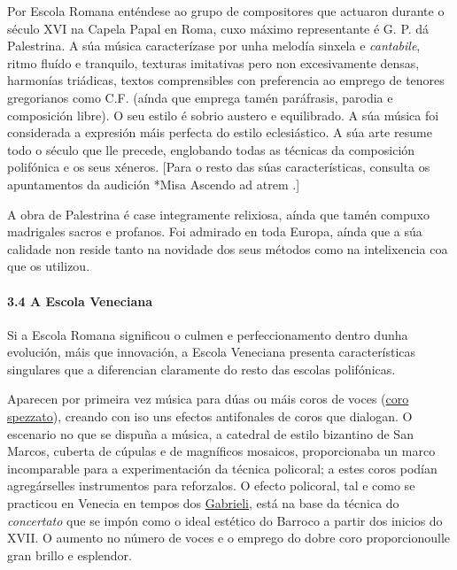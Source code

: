 \documentclass[
]{article}
\begin{document}
Por Escola Romana enténdese ao grupo de compositores que actuaron
durante o século XVI na Capela Papal en Roma, cuxo máximo representante
é G. P. dá Palestrina. A súa música caracterízase por unha melodía
sinxela e \emph{cantabile}, ritmo fluído e tranquilo, texturas
imitativas pero non excesivamente densas, harmonías triádicas, textos
comprensibles con preferencia ao emprego de tenores gregorianos como
C.F. (aínda que emprega tamén paráfrasis, parodia e composición libre).
O seu estilo é sobrio austero e equilibrado. A súa música foi
considerada a expresión máis perfecta do estilo eclesiástico. A súa arte
resume todo o século que lle precede, englobando todas as técnicas da
composición polifónica e os seus xéneros. {[}Para o resto das súas
características, consulta os apuntamentos da audición *Misa Ascendo ad
atrem .{]}

A obra de Palestrina é case integramente relixiosa, aínda que tamén
compuxo madrigales sacros e profanos. Foi admirado en toda Europa, aínda
que a súa calidade non reside tanto na novidade dos seus métodos como na
intelixencia coa que os utilizou.

\hypertarget{34-a-escola-veneciana}{%
\paragraph{\texorpdfstring{\textbf{3.4 A Escola
Veneciana}}{3.4 A Escola Veneciana}}\label{34-a-escola-veneciana}}

Si a Escola Romana significou o culmen e perfeccionamento dentro dunha
evolución, máis que innovación, a Escola Veneciana presenta
características singulares que a diferencian claramente do resto das
escolas polifónicas.

Aparecen por primeira vez música para dúas ou máis coros de voces
(\href{http://es.wikipedia.org/wiki/Estilo_policoral_veneciano}{coro
spezzato}), creando con iso uns efectos antifonales de coros que
dialogan. O escenario no que se dispuña a música, a catedral de estilo
bizantino de San Marcos, cuberta de cúpulas e de magníficos mosaicos,
proporcionaba un marco incomparable para a experimentación da técnica
policoral; a estes coros podían agregárselles instrumentos para
reforzalos. O efecto policoral, tal e como se practicou en Venecia en
tempos dos
\href{http://open.spotify.com/track/6r9zLucRqaSSyV4XS4t7HL}{Gabrieli,}
está na base da técnica do \emph{concertato} que se impón como o ideal
estético do Barroco a partir dos inicios do XVII. O aumento no número de
voces e o emprego do dobre coro proporcionoulle gran brillo e esplendor.
\end{document}
